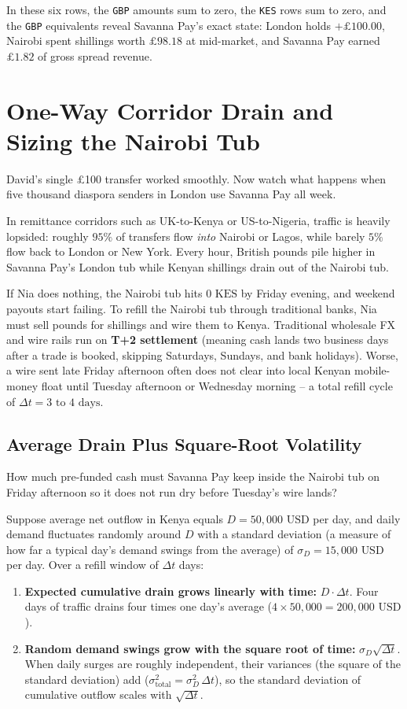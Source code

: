 In these six rows, the \texttt{GBP} amounts sum to zero, the \texttt{KES} rows sum to zero, and the \texttt{GBP} equivalents reveal Savanna Pay's exact state: London holds $+\pounds 100.00$, Nairobi spent shillings worth $\pounds 98.18$ at mid-market, and Savanna Pay earned $\pounds 1.82$ of gross spread revenue.

\section{One-Way Corridor Drain and Sizing the Nairobi Tub}

David's single \pounds 100 transfer worked smoothly. Now watch what happens when five thousand diaspora senders in London use Savanna Pay all week.

In remittance corridors such as UK-to-Kenya or US-to-Nigeria, traffic is heavily lopsided: roughly $95\%$ of transfers flow \emph{into} Nairobi or Lagos, while barely $5\%$ flow back to London or New York. Every hour, British pounds pile higher in Savanna Pay's London tub while Kenyan shillings drain out of the Nairobi tub.

If Nia does nothing, the Nairobi tub hits $0\text{ KES}$ by Friday evening, and weekend payouts start failing. To refill the Nairobi tub through traditional banks, Nia must sell pounds for shillings and wire them to Kenya. Traditional wholesale FX and wire rails run on \textbf{T+2 settlement} (meaning cash lands two business days after a trade is booked, skipping Saturdays, Sundays, and bank holidays). Worse, a wire sent late Friday afternoon often does not clear into local Kenyan mobile-money float until Tuesday afternoon or Wednesday morning -- a total refill cycle of $\Delta t = 3\text{ to }4\text{ days}$.

\subsection{Average Drain Plus Square-Root Volatility}

How much pre-funded cash must Savanna Pay keep inside the Nairobi tub on Friday afternoon so it does not run dry before Tuesday's wire lands?

Suppose average net outflow in Kenya equals $D = 50{,}000\text{ USD}$ per day, and daily demand fluctuates randomly around $D$ with a standard deviation (a measure of how far a typical day's demand swings from the average) of $\sigma_D = 15{,}000\text{ USD}$ per day. Over a refill window of $\Delta t$ days:
\begin{enumerate}
  \item \textbf{Expected cumulative drain grows linearly with time:} $D \cdot \Delta t$. Four days of traffic drains four times one day's average ($4 \times 50{,}000 = 200{,}000\text{ USD}$).
  \item \textbf{Random demand swings grow with the square root of time:} $\sigma_D \sqrt{\Delta t}$. When daily surges are roughly independent, their variances (the square of the standard deviation) add ($\sigma_{\text{total}}^2 = \sigma_D^2 \,\Delta t$), so the standard deviation of cumulative outflow scales with $\sqrt{\Delta t}$.
\end{enumerate}

